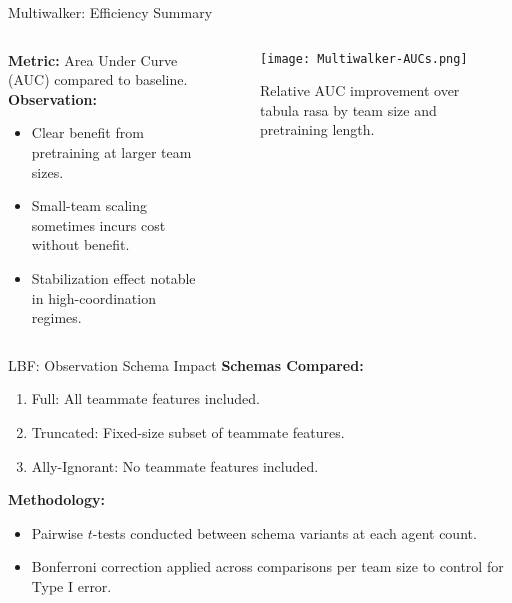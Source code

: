 \begin{frame}{Multiwalker: Efficiency Summary}
    \begin{columns}
        \begin{column}{0.45\linewidth}
            \textbf{Metric:} Area Under Curve (AUC) compared to baseline. \\
            \textbf{Observation:}
            \begin{itemize}
                \item Clear benefit from pretraining at larger team sizes.
                \item Small-team scaling sometimes incurs cost without benefit.
                \item Stabilization effect notable in high-coordination regimes.
            \end{itemize}
        \end{column}
        \begin{column}{0.55\linewidth}
            \begin{figure}
                \texttt{[image: Multiwalker-AUCs.png]}
                \caption{Relative AUC improvement over tabula rasa by team size and pretraining length.}
            \end{figure}
        \end{column}
    \end{columns}
\end{frame}

\begin{frame}{LBF: Observation Schema Impact}
            \textbf{Schemas Compared:}
            \begin{enumerate}
                \item Full: All teammate features included.
                \item Truncated: Fixed-size subset of teammate features.
                \item Ally-Ignorant: No teammate features included.
            \end{enumerate}

            \vspace{1em}
            \textbf{Methodology:}
            \begin{itemize}
                \item Pairwise $t$-tests conducted between schema variants at each agent count.
                \item Bonferroni correction applied across comparisons per team size to control for Type I error.
            \end{itemize}
\end{frame}

